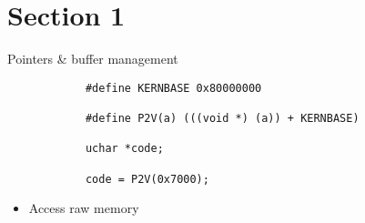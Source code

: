 \documentclass[10pt]{beamer} %
\begin{document}
\section{Section 1}
{
	\begin{frame}[fragile]{Pointers \& buffer management}

		\begin{lstlisting}
			#define KERNBASE 0x80000000

			#define P2V(a) (((void *) (a)) + KERNBASE)

			uchar *code;
			
			code = P2V(0x7000);
		\end{lstlisting}

	\begin{itemize}
	\item<1-> Access raw memory
		
	\end{itemize}
	\end{frame}
}	
	
\end{document}

